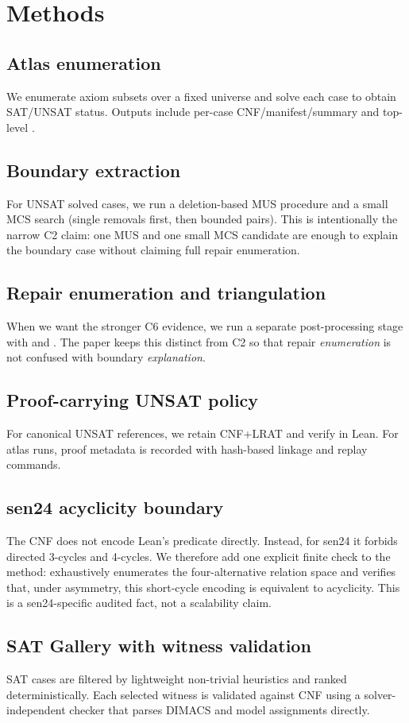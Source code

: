 \section{Methods}

\subsection{Atlas enumeration}
We enumerate axiom subsets over a fixed universe and solve each case to obtain SAT/UNSAT status.
Outputs include per-case CNF/manifest/summary and top-level .

\subsection{Boundary extraction}
For UNSAT solved cases, we run a deletion-based MUS procedure and a small MCS search (single removals first, then bounded pairs).
This is intentionally the narrow C2 claim: one MUS and one small MCS candidate are enough to explain the boundary case without claiming full repair enumeration.

\subsection{Repair enumeration and triangulation}
When we want the stronger C6 evidence, we run a separate post-processing stage with  and .
The paper keeps this distinct from C2 so that repair \emph{enumeration} is not confused with boundary \emph{explanation}.

\subsection{Proof-carrying UNSAT policy}
For canonical UNSAT references, we retain CNF+LRAT and verify in Lean.
For atlas runs, proof metadata is recorded with hash-based linkage and replay commands.

\subsection{sen24 acyclicity boundary}
The CNF does not encode Lean's  predicate directly. Instead, for sen24 it forbids directed 3-cycles and 4-cycles.
We therefore add one explicit finite check to the method:  exhaustively enumerates the four-alternative relation space and verifies that, under asymmetry, this short-cycle encoding is equivalent to acyclicity.
This is a sen24-specific audited fact, not a scalability claim.

\subsection{SAT Gallery with witness validation}
SAT cases are filtered by lightweight non-trivial heuristics and ranked deterministically.
Each selected witness is validated against CNF using a solver-independent checker that parses DIMACS and model assignments directly.
